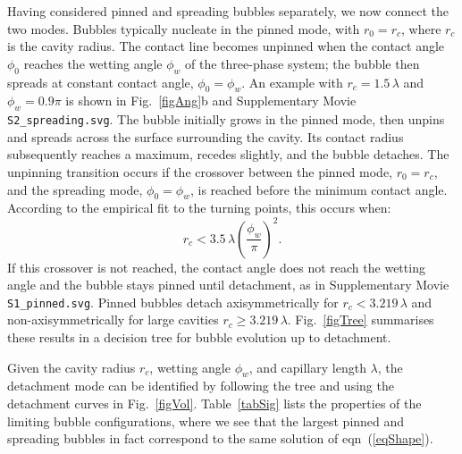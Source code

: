 \documentclass[9pt]{extarticle}
\begin{document}
Having considered pinned and spreading bubbles separately, we now connect the two modes. Bubbles typically nucleate in the pinned mode\cite{chi-yeh65mechanism}, with $r_0=r_c$, where $r_c$ is the cavity radius. The contact line becomes unpinned when the contact angle $\phi_0$ reaches the wetting angle $\phi_w$ of the three-phase system\cite{chesters78modes}; the bubble then spreads at constant contact angle, $\phi_0=\phi_w$. An example with $r_c=1.5\,\lambda$ and $\phi_w=0.9\pi$ is shown in Fig.~\ref{figAng}b and Supplementary Movie \texttt{S2\_spreading.svg}. The bubble initially grows in the pinned mode, then unpins and spreads across the surface surrounding the cavity. Its contact radius subsequently reaches a maximum, recedes slightly, and the bubble detaches. The unpinning transition occurs if the crossover between the pinned mode, $r_0=r_c$, and the spreading mode, $\phi_0=\phi_w$, is reached before the minimum contact angle. According to the empirical fit to the turning points, this occurs when:
\begin{equation}
r_c < 3.5\,\lambda\left(\frac{\phi_w}{\pi}\right)^2.
\end{equation}
If this crossover is not reached, the contact angle does not reach the wetting angle and the bubble stays pinned until detachment, as in Supplementary Movie \texttt{S1\_pinned.svg}. Pinned bubbles detach axisymmetrically for $r_c<3.219\,\lambda$ and non-axisymmetrically for large cavities $r_c\ge3.219\,\lambda$. Fig.~\ref{figTree} summarises these results in a decision tree for bubble evolution up to detachment. 

Given the cavity radius $r_c$, wetting angle $\phi_w$, and capillary length $\lambda$, the detachment mode can be identified by following the tree and using the detachment curves in Fig.~\ref{figVol}. Table~\ref{tabSig} lists the properties of the limiting bubble configurations, where we see that the largest pinned and spreading bubbles in fact correspond to the same solution of eqn~(\ref{eqShape}).
\end{document}

